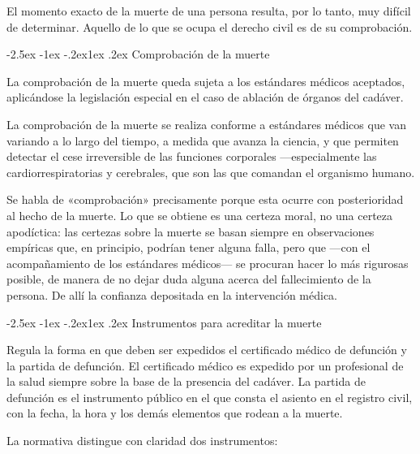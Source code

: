 \documentclass[12pt,oneside]{book}
\makeatletter
\renewcommand\subsection{\@startsection{subsection}{2}{\z@}%
  {-2.5ex \@plus -1ex \@minus -.2ex}{1ex \@plus .2ex}%
  {\normalfont\normalsize\bfseries}}
\makeatother
\begin{document}
El momento exacto de la muerte de una persona resulta, por lo tanto, muy difícil de determinar. Aquello de lo que se ocupa el derecho civil es de su comprobación.

\subsection{Comprobación de la muerte}

\begin{regla}
La comprobación de la muerte queda sujeta a los estándares médicos aceptados, aplicándose la legislación especial en el caso de ablación de órganos del cadáver.
\end{regla}

La comprobación de la muerte se realiza conforme a estándares médicos que van variando a lo largo del tiempo, a medida que avanza la ciencia, y que permiten detectar el cese irreversible de las funciones corporales ---especialmente las cardiorrespiratorias y cerebrales, que son las que comandan el organismo humano.

Se habla de «comprobación» precisamente porque esta ocurre con posterioridad al hecho de la muerte. Lo que se obtiene es una certeza moral, no una certeza apodíctica: las certezas sobre la muerte se basan siempre en observaciones empíricas que, en principio, podrían tener alguna falla, pero que ---con el acompañamiento de los estándares médicos--- se procuran hacer lo más rigurosas posible, de manera de no dejar duda alguna acerca del fallecimiento de la persona. De allí la confianza depositada en la intervención médica.

\subsection{Instrumentos para acreditar la muerte}

\begin{regla}
Regula la forma en que deben ser expedidos el certificado médico de defunción y la partida de defunción. El certificado médico es expedido por un profesional de la salud siempre sobre la base de la presencia del cadáver. La partida de defunción es el instrumento público en el que consta el asiento en el registro civil, con la fecha, la hora y los demás elementos que rodean a la muerte.
\end{regla}

La normativa distingue con claridad dos instrumentos:
\end{document}
